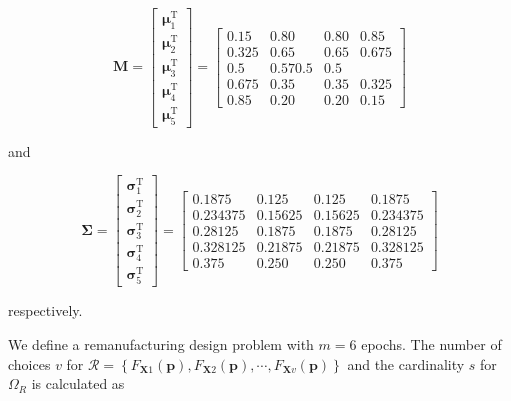 \begin{equation*}
	\mathbf{M} = \begin{bmatrix}
		\boldsymbol{\mu}_1 ^ {\mathrm{T}} \\ 
		\boldsymbol{\mu}_2 ^ {\mathrm{T}} \\
		\boldsymbol{\mu}_3 ^ {\mathrm{T}} \\
		\boldsymbol{\mu}_4 ^ {\mathrm{T}} \\
		\boldsymbol{\mu}_5 ^ {\mathrm{T}} 
	\end{bmatrix} = \begin{bmatrix}
		0.15 & 0.80 & 0.80 & 0.85 \\ 
		0.325 & 0.65 & 0.65 & 0.675 \\
		0.5 & 0.5 70.5 & 0.5 \\
		0.675 & 0.35 & 0.35 & 0.325 \\
		0.85 & 0.20 & 0.20 & 0.15 
	\end{bmatrix}
\end{equation*}

and

\begin{equation*}
	\boldsymbol{\Sigma} = \begin{bmatrix}
		\boldsymbol{\sigma}_1 ^ {\mathrm{T}} \\ 
		\boldsymbol{\sigma}_2 ^ {\mathrm{T}} \\
		\boldsymbol{\sigma}_3 ^ {\mathrm{T}} \\
		\boldsymbol{\sigma}_4 ^ {\mathrm{T}} \\
		\boldsymbol{\sigma}_5 ^ {\mathrm{T}} 
	\end{bmatrix} = \begin{bmatrix}
		0.1875 & 0.125 & 0.125 & 0.1875 \\ 
		0.234375 & 0.15625 & 0.15625 & 0.234375 \\
		0.28125 & 0.1875 & 0.1875 & 0.28125 \\
		0.328125 & 0.21875 & 0.21875 & 0.328125 \\
		0.375 & 0.250 & 0.250 & 0.375
	\end{bmatrix}
\end{equation*}

respectively.

We define a remanufacturing design problem with $m = 6$ epochs. The number of choices $v$ for $\mathcal{R} = \left\{F_{\mathbf{X}1}(\mathbf{p}),F_{\mathbf{X}2}(\mathbf{p}),\cdots,F_{\mathbf{X}v}(\mathbf{p})\right\}$ and the cardinality $s$ for $\Omega_R$ is calculated as

